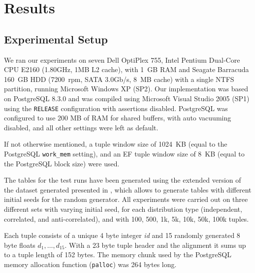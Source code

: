 


\chapter{Results}
\label{chap:results}


\section{Experimental Setup}
We ran our experiments on seven Dell OptiPlex 755, Intel Pentium
Dual-Core CPU E2160 (1.80GHz, 1MB L2 cache), with 1~GB RAM and Seagate
Barracuda 160~GB HDD (7200~rpm, SATA 3.0Gb/s, 8~MB cache) with a
single NTFS partition,
running Microsoft Windows XP (SP2).
% 
Our implementation was based on PostgreSQL 8.3.0 and was compiled
using Microsoft Visual Studio 2005 (SP1) using the \texttt{RELEASE}
configuration with assertions disabled.
%
PostgreSQL was configured to use 200 MB of RAM for shared buffers,
with auto vacuuming disabled, and all other settings were left as
default.

If not otherwise mentioned, a tuple window size of 1024~KB (equal to
the PostgreSQL \texttt{work\_mem} setting), and an EF tuple window
size of 8~KB (equal to the PostgreSQL block size) were used.

The tables for the test runs have been generated using the extended
version \citep{Eder2007a} of the dataset generated presented in
\citep{Borzsonyi2001}, which allows to generate tables with
different initial seeds for the random generator. All experiments
were carried out on three different sets with varying initial seed, for each
distribution type (independent, correlated, and anti-correlated), and
with 100, 500, 1k, 5k, 10k, 50k, 100k tuples.

Each tuple consists of a unique 4 byte integer \emph{id} and 15
randomly generated 8 byte floats $d_1, \ldots, d_{15}$. With a 23 byte
tuple header and the alignment it sums up to a tuple length of 152 bytes. 
The memory chunk used by the PostgreSQL memory allocation function
(\texttt{palloc}) was 264 bytes long.
%
%
%
%
%

